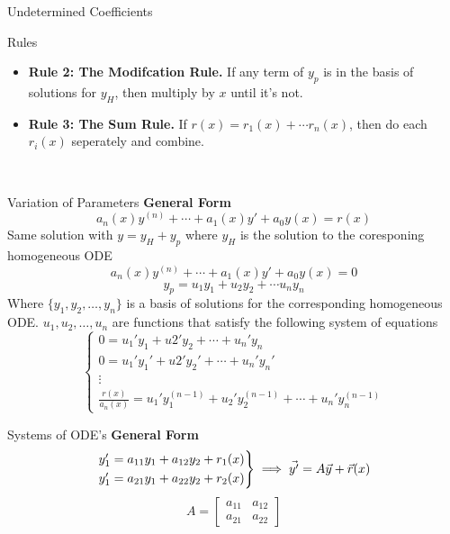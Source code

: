 \documentclass{article}
\begin{document}
\begin{multicols*}{3}
\begin{blackbox}{Undetermined Coefficients}
\begin{pinkbox}{Rules}
\begin{itemize}[leftmargin=5pt]
                \item \textbf{Rule 2: The Modifcation Rule.} If any term of $y_p$ is in the basis of solutions for $y_H$, then multiply by $x$ until it's not.
                \item \textbf{Rule 3: The Sum Rule.} If $r(x) = r_1(x) + \cdots r_n(x)$, then do each $r_i(x)$ seperately and combine.
            \end{itemize}
    
        \end{pinkbox}\\[-2ex]
    \end{blackbox}
    \begin{blackbox}{Variation of Parameters}
        {\footnotesize
        \textbf{General Form}\\[-2ex]
            \[a_n(x)y^{(n)} + \cdots + a_1(x)y' + a_0y(x) = r(x)\]
            Same solution with $y = y_H + y_p$ where $y_H$ is the solution to the coresponing homogeneous ODE\\[-1.5ex]
            \[a_n(x)y^{(n)} + \cdots + a_1(x)y' + a_0y(x) = 0\]
            \[y_p = u_1y_1 + u_2y_2 + \cdots u_ny_n\]
            Where $\{y_1,y_2,\ldots,y_n\}$ is a basis of solutions for the corresponding homogeneous ODE. $u_1, u_2, \ldots, u_n$ are functions that satisfy the following system of equations 
            \[\begin{cases}
                0 = u_1'y_1 + u2'y_2 + \cdots + u_n'y_n \\
                0 = u_1'y_1' + u2'y_2' + \cdots + u_n'y_n' \\
                \vdots\\
                \frac{r(x)}{a_n(x)} = u_1'y_1^{(n-1)} + u_2'y_2^{(n-1)} + \cdots + u_n'y_n ^{(n-1)} 
            \end{cases}\]
        }
    \end{blackbox}
    \begin{blackbox}{Systems of ODE's}
        {\footnotesize
        \textbf{General Form}\\[-2ex]
        \[\begin{rcases}
            y_1' = a_{11}y_1 + a_{12}y_2 + r_1(x)\\
            y_1' = a_{21}y_1 + a_{22}y_2 + r_2(x)  
        \end{rcases} \implies \vec{y'} = A\vec{y} + \vec{r}(x)\]
        \[A = \begin{bmatrix}
            a_{11} & a_{12}\\
            a_{21} & a_{22}

\end{bmatrix}\]}
\end{blackbox}
\end{multicols*}
\end{document}
